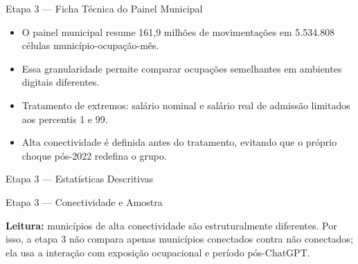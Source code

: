 \documentclass[
  ignorenonframetext,
  aspectratio=169,
]{beamer}
\providecommand{\tightlist}{%
  \setlength{\itemsep}{0pt}\setlength{\parskip}{0pt}}
\begin{document}
\begin{frame}{Etapa 3 --- Ficha Técnica do Painel Municipal}
\label{etapa-3-ficha-tuxe9cnica-do-painel-municipal}
\begin{center}
\resizebox{0.82\textwidth}{!}{}
\end{center}

\vspace{0.2cm}

\begin{itemize}
\tightlist
\item
  O painel municipal resume 161,9 milhões de movimentações em 5.534.808
  células município-ocupação-mês.
\item
  Essa granularidade permite comparar ocupações semelhantes em ambientes
  digitais diferentes.
\item
  Tratamento de extremos: salário nominal e salário real de admissão
  limitados aos percentis 1 e 99.
\item
  Alta conectividade é definida antes do tratamento, evitando que o
  próprio choque pós-2022 redefina o grupo.
\end{itemize}
\end{frame}

\begin{frame}{Etapa 3 --- Estatísticas Descritivas}
\label{etapa-3-estatuxedsticas-descritivas}
\begin{center}
\resizebox{0.96\textwidth}{!}{}
\end{center}
\end{frame}

\begin{frame}{Etapa 3 --- Conectividade e Amostra}
\label{etapa-3-conectividade-e-amostra}
\begin{center}
\resizebox{0.82\textwidth}{!}{}
\end{center}

\vspace{0.15cm}

\textbf{Leitura:} municípios de alta conectividade são estruturalmente
diferentes. Por isso, a etapa 3 não compara apenas municípios conectados
contra não conectados; ela usa a interação com exposição ocupacional e
período pós-ChatGPT.
\end{frame}
\end{document}
